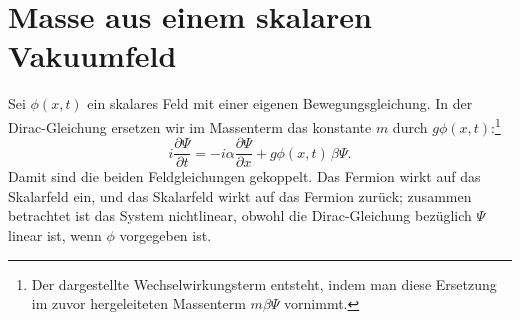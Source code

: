 \begin{classroomqa}
\end{classroomqa}

\section{Masse aus einem skalaren Vakuumfeld}

\begin{classroomqa}
\end{classroomqa}

Sei \(\phi(x,t)\) ein skalares Feld mit einer eigenen Bewegungsgleichung. In der Dirac-Gleichung ersetzen wir im Massenterm das konstante \(m\) durch \(g\phi(x,t)\):\footnote{Der dargestellte Wechselwirkungsterm entsteht, indem man diese Ersetzung im zuvor hergeleiteten Massenterm \(m\beta\Psi\) vornimmt.}
\begin{equation}
i\frac{\partial\Psi}{\partial t}
=
-i\alpha\frac{\partial\Psi}{\partial x}
+g\phi(x,t)\,\beta\Psi.
\end{equation}
Damit sind die beiden Feldgleichungen gekoppelt. Das Fermion wirkt auf das Skalarfeld ein, und das Skalarfeld wirkt auf das Fermion zurück; zusammen betrachtet ist das System nichtlinear, obwohl die Dirac-Gleichung bezüglich \(\Psi\) linear ist, wenn \(\phi\) vorgegeben ist.

